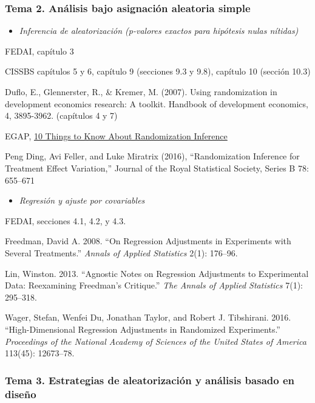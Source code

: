 \documentclass[
  12pt,
]{article}
\providecommand{\tightlist}{%
  \setlength{\itemsep}{0pt}\setlength{\parskip}{0pt}}
\begin{document}
\hypertarget{tema-2.-anuxe1lisis-bajo-asignaciuxf3n-aleatoria-simple-1}{%
\subsubsection{Tema 2. Análisis bajo asignación aleatoria
simple}\label{tema-2.-anuxe1lisis-bajo-asignaciuxf3n-aleatoria-simple-1}}

\begin{itemize}
\tightlist
\item
  \emph{Inferencia de aleatorización (p-valores exactos para hipótesis
  nulas nítidas)}
\end{itemize}

FEDAI, capítulo 3

CISSBS capítulos 5 y 6, capítulo 9 (secciones 9.3 y 9.8), capítulo 10
(sección 10.3)

Duflo, E., Glennerster, R., \& Kremer, M. (2007). Using randomization in
development economics research: A toolkit. Handbook of development
economics, 4, 3895-3962. (capítulos 4 y 7)

EGAP,
\href{https://egap.org/resource/10-things-to-know-about-hypothesis-testing/}{10
Things to Know About Randomization Inference}

Peng Ding, Avi Feller, and Luke Miratrix (2016), ``Randomization
Inference for Treatment Effect Variation,'' Journal of the Royal
Statistical Society, Series B 78: 655--671

\begin{itemize}
\tightlist
\item
  \emph{Regresión y ajuste por covariables}
\end{itemize}

FEDAI, secciones 4.1, 4.2, y 4.3.

Freedman, David A. 2008. ``On Regression Adjustments in Experiments with
Several Treatments.'' \emph{Annals of Applied Statistics} 2(1): 176--96.

Lin, Winston. 2013. ``Agnostic Notes on Regression Adjustments to
Experimental Data: Reexamining Freedman's Critique.'' \emph{The Annals
of Applied Statistics} 7(1): 295--318.

Wager, Stefan, Wenfei Du, Jonathan Taylor, and Robert J. Tibshirani.
2016. ``High-Dimensional Regression Adjustments in Randomized
Experiments.'' \emph{Proceedings of the National Academy of Sciences of
the United States of America} 113(45): 12673--78.

\hypertarget{tema-3.-estrategias-de-aleatorizaciuxf3n-y-anuxe1lisis-basado-en-diseuxf1o-1}{%
\subsubsection{Tema 3. Estrategias de aleatorización y análisis basado
en
diseño}\label{tema-3.-estrategias-de-aleatorizaciuxf3n-y-anuxe1lisis-basado-en-diseuxf1o-1}}
\end{document}
